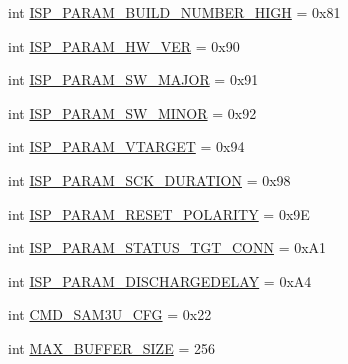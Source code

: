 \begin{DoxyCompactItemize}
\item 
int \hyperlink{classsoftware_1_1chipwhisperer_1_1hardware_1_1naeusb_1_1programmer__avr_1_1AVRISP_a6c6551dd2357004f0f2e474a453ee61e}{I\+S\+P\+\_\+\+P\+A\+R\+A\+M\+\_\+\+B\+U\+I\+L\+D\+\_\+\+N\+U\+M\+B\+E\+R\+\_\+\+H\+I\+G\+H} = 0x81
\item 
int \hyperlink{classsoftware_1_1chipwhisperer_1_1hardware_1_1naeusb_1_1programmer__avr_1_1AVRISP_aa6f78f7b4cc0350ec4e4b4734ad5575f}{I\+S\+P\+\_\+\+P\+A\+R\+A\+M\+\_\+\+H\+W\+\_\+\+V\+E\+R} = 0x90
\item 
int \hyperlink{classsoftware_1_1chipwhisperer_1_1hardware_1_1naeusb_1_1programmer__avr_1_1AVRISP_af042bdd48079327d8ab9493668ee5e45}{I\+S\+P\+\_\+\+P\+A\+R\+A\+M\+\_\+\+S\+W\+\_\+\+M\+A\+J\+O\+R} = 0x91
\item 
int \hyperlink{classsoftware_1_1chipwhisperer_1_1hardware_1_1naeusb_1_1programmer__avr_1_1AVRISP_abf3b5115e731ac76fd7ad0553d73b9b8}{I\+S\+P\+\_\+\+P\+A\+R\+A\+M\+\_\+\+S\+W\+\_\+\+M\+I\+N\+O\+R} = 0x92
\item 
int \hyperlink{classsoftware_1_1chipwhisperer_1_1hardware_1_1naeusb_1_1programmer__avr_1_1AVRISP_a03c2fb663dad19161a7b826ff2b28873}{I\+S\+P\+\_\+\+P\+A\+R\+A\+M\+\_\+\+V\+T\+A\+R\+G\+E\+T} = 0x94
\item 
int \hyperlink{classsoftware_1_1chipwhisperer_1_1hardware_1_1naeusb_1_1programmer__avr_1_1AVRISP_a4267928fb97172d3316e6ec183184736}{I\+S\+P\+\_\+\+P\+A\+R\+A\+M\+\_\+\+S\+C\+K\+\_\+\+D\+U\+R\+A\+T\+I\+O\+N} = 0x98
\item 
int \hyperlink{classsoftware_1_1chipwhisperer_1_1hardware_1_1naeusb_1_1programmer__avr_1_1AVRISP_a8f89043d7c6f10ad52286a7f1cf94521}{I\+S\+P\+\_\+\+P\+A\+R\+A\+M\+\_\+\+R\+E\+S\+E\+T\+\_\+\+P\+O\+L\+A\+R\+I\+T\+Y} = 0x9\+E
\item 
int \hyperlink{classsoftware_1_1chipwhisperer_1_1hardware_1_1naeusb_1_1programmer__avr_1_1AVRISP_abd1458c916ba5557268e9d81cdc8d4c6}{I\+S\+P\+\_\+\+P\+A\+R\+A\+M\+\_\+\+S\+T\+A\+T\+U\+S\+\_\+\+T\+G\+T\+\_\+\+C\+O\+N\+N} = 0x\+A1
\item 
int \hyperlink{classsoftware_1_1chipwhisperer_1_1hardware_1_1naeusb_1_1programmer__avr_1_1AVRISP_a86da83aea6f5bc2d67950d0bf435ca9d}{I\+S\+P\+\_\+\+P\+A\+R\+A\+M\+\_\+\+D\+I\+S\+C\+H\+A\+R\+G\+E\+D\+E\+L\+A\+Y} = 0x\+A4
\item 
int \hyperlink{classsoftware_1_1chipwhisperer_1_1hardware_1_1naeusb_1_1programmer__avr_1_1AVRISP_af627b5a5032f0be7e6c31419f4eca33c}{C\+M\+D\+\_\+\+S\+A\+M3\+U\+\_\+\+C\+F\+G} = 0x22
\item 
int \hyperlink{classsoftware_1_1chipwhisperer_1_1hardware_1_1naeusb_1_1programmer__avr_1_1AVRISP_a07f57a817d0764c6b3d37a1a1171ab1c}{M\+A\+X\+\_\+\+B\+U\+F\+F\+E\+R\+\_\+\+S\+I\+Z\+E} = 256
\end{DoxyCompactItemize}


